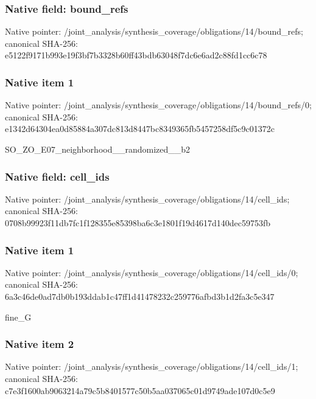 \documentclass[10pt,a4paper]{article}
\begin{document}
\subsubsection{Native field: bound\_\allowbreak{}refs}
Native pointer: /joint\_\allowbreak{}analysis/synthesis\_\allowbreak{}coverage/obligations/14/bound\_\allowbreak{}refs; canonical SHA-256: e5122f9171b993e19f3bf7b3328b60ff43bdb63048f7dc6e6ad2c88fd1cc6c78

\subsubsection{Native item 1}
Native pointer: /joint\_\allowbreak{}analysis/synthesis\_\allowbreak{}coverage/obligations/14/bound\_\allowbreak{}refs/0; canonical SHA-256: e1342d64304ea0d85884a307dc813d8447bc8349365fb5457258df5c9c01372c

\begingroup\raggedright\sloppy SO\_\allowbreak{}ZO\_\allowbreak{}E07\_\allowbreak{}neighborhood\_\allowbreak{}\_\allowbreak{}randomized\_\allowbreak{}\_\allowbreak{}b2\par\endgroup

\subsubsection{Native field: cell\_\allowbreak{}ids}
Native pointer: /joint\_\allowbreak{}analysis/synthesis\_\allowbreak{}coverage/obligations/14/cell\_\allowbreak{}ids; canonical SHA-256: 0708b99923f11db7fc1f128355e85398ba6c3e1801f19d4617d140dec59753fb

\subsubsection{Native item 1}
Native pointer: /joint\_\allowbreak{}analysis/synthesis\_\allowbreak{}coverage/obligations/14/cell\_\allowbreak{}ids/0; canonical SHA-256: 6a3c46de0ad7db0b193ddab1c47ff1d41478232c259776afbd3b1d2fa3c5e347

\begingroup\raggedright\sloppy fine\_\allowbreak{}G\par\endgroup

\subsubsection{Native item 2}
Native pointer: /joint\_\allowbreak{}analysis/synthesis\_\allowbreak{}coverage/obligations/14/cell\_\allowbreak{}ids/1; canonical SHA-256: c7e3f1600ab9063214a79c5b8401577c50b5aa037065c01d9749ade107d0c5e9
\end{document}
